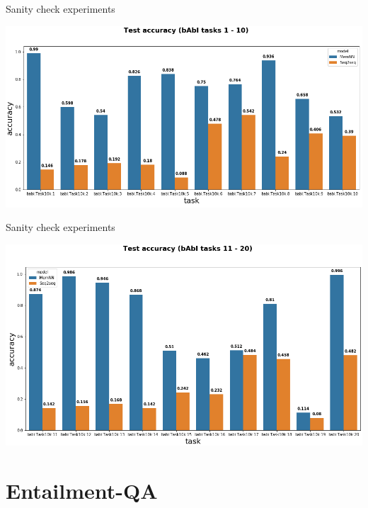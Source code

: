\documentclass[10pt]{beamer}
\begin{document}
\begin{frame}{Sanity check experiments}
\begin{center}
\includegraphics[scale=0.34]{images/comparative_results_babi1.png}
\end{center}
\end{frame}

\begin{frame}{Sanity check experiments}
\begin{center}
\includegraphics[scale=0.34]{images/comparative_results_babi2.png}
\end{center}
\end{frame}

\section{Entailment-QA}
\end{document}
